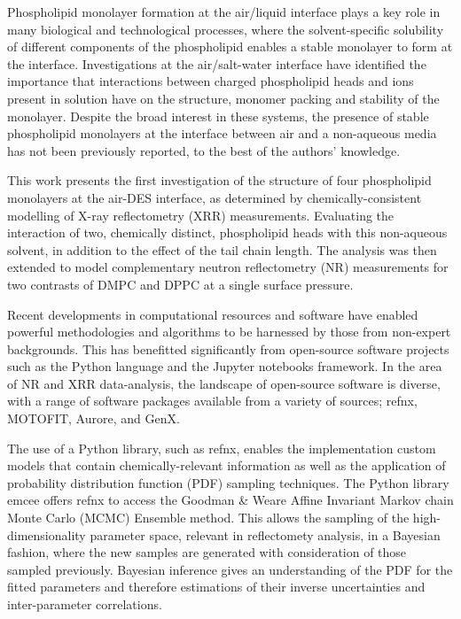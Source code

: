 \documentclass[twocolumn,a4paper]{paper}
\begin{document}
Phospholipid monolayer formation at the air/liquid interface plays a key role in many biological and technological processes, where the solvent-specific solubility of different components of the phospholipid enables a stable monolayer to form at the interface\cite{Mohwald1990}.
Investigations at the air/salt-water interface have identified the importance that interactions between charged phospholipid heads and ions present in solution have on the structure, monomer packing and stability of the monolayer\cite{Mohwald1990,Kewalramani2010}.
Despite the broad interest in these systems, the presence of stable phospholipid monolayers at the interface between air and a non-aqueous media has not been previously reported, to the best of the authors' knowledge.

This work presents the first investigation of the structure of four phospholipid monolayers at the air-DES interface, as determined by chemically-consistent modelling of X-ray reflectometry (XRR) measurements.
Evaluating the interaction of two, chemically distinct, phospholipid heads with this non-aqueous solvent, in addition to the effect of the tail chain length. The analysis was then extended to model complementary neutron reflectometry (NR) measurements for two contrasts of DMPC and DPPC at a single surface pressure.

Recent developments in computational resources and software have enabled powerful methodologies and algorithms to be harnessed by those from non-expert backgrounds.
This has benefitted significantly from open-source software projects such as the Python language\cite{vanRossum1995} and the Jupyter notebooks framework\cite{Kluyver2016}.
In the area of NR and XRR data-analysis, the landscape of open-source software is diverse, with a range of software packages available from a variety of sources; refnx\cite{Nelson2018}, MOTOFIT\cite{Nelson2006}, Aurore\cite{Gerelli2016}, and GenX\cite{Bjorck2007}.

The use of a Python library, such as refnx, enables the implementation custom models that contain chemically-relevant information as well as the application of probability distribution function (PDF) sampling techniques.
The Python library emcee\cite{Foreman-Mackey2013} offers refnx to access the Goodman \& Weare Affine Invariant Markov chain Monte Carlo (MCMC) Ensemble method\cite{Goodman2010}.
This allows the sampling of the high-dimensionality parameter space, relevant in reflectomety analysis, in a Bayesian fashion, where the new samples are generated with consideration of those sampled previously\cite{Sivia2006}.
Bayesian inference gives an understanding of the PDF for the fitted parameters and therefore estimations of their inverse uncertainties and inter-parameter correlations.
\end{document}
